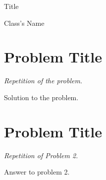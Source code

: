 \documentclass{article}
\title{\titleInfo}
\author{\authorName}
\newcommand{\titleInfo}
  {Title}
\newcommand{\classTitle}
  {Class's Name}
\newcommand{\schoolInfo}
  {University/College's Name, \the\year\\ Grader: Grader's Name}
\newcommand{\shortmaketitle} {
  \begin{center}
    \huge\titleInfo

    \vspace{0.3cm}
    \large\classTitle

    \normalsize
    \vspace{1.5pc}
  \end{center}
}
\begin{document}
  \shortmaketitle

  \section{Problem Title}
    \textit{Repetition of the problem.}\vspace{2pc}

    Solution to the problem.\clearpage

  \section{Problem Title}
    \textit{Repetition of Problem 2.}\vspace{2pc}

    Answer to problem 2.
\end{document}
